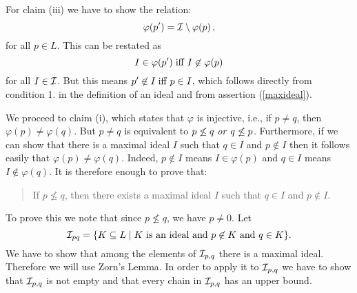 For claim (iii) we have to show the relation:
\[  \varphi(p') = {\cal I} \setminus \varphi(p)\,, \]
for all $p \in L$. This can be restated as
\[ I \in \varphi(p') \; {\rm iff} \; I \not\in \varphi(p) \]
for all $I \in {\cal I}$.
But this means $p' \not\in I \; {\rm iff} \; p \in I$, which
follows directly from condition 1. in the definition of an ideal and
from assertion (\ref{maxideal}).

We proceed to claim (i), which states that $\varphi$ is injective,
i.e., if $p \neq q$, then $\varphi(p)\neq \varphi(q)$.
But $p\neq q$ is equivalent to $p\not\le q\
{\it or}\ q\not\le p$.
 Furthermore, if we can show that there is a maximal ideal $I$ such that
$q\in I$ and $p\not\in I$
then it follows easily that $\varphi(p)\neq\varphi(q)$.
Indeed, $p\not\in I$ means $I\in \varphi(p)$
and  $q\in I$ means $I\not\in\varphi(q)$.
It is therefore enough to prove that:
\begin{quote}
If $p\not\le q$, then there exists a maximal ideal $I$
such that $q\in I$ and $p\not\in I$.
\end{quote}
To prove this we note that since $p\not\le q$, we have $p\neq 0$. Let
\[ {\cal I}_{pq}=\{K\subseteq L \mid K\ {\rm is\ an\ ideal\ and}\ p\not\in
K\ {\rm and}\ q\in K\}.\]
We have to show that among the elements of ${\cal I}_{p,q}$ there is a
maximal ideal.
Therefore we will use Zorn's Lemma.
In order to apply it to ${\cal I}_{p,q}$ we have to show
 that ${\cal I}_{p,q}$ is not empty and
that every chain in ${\cal I}_{p,q}$ has an upper bound.

